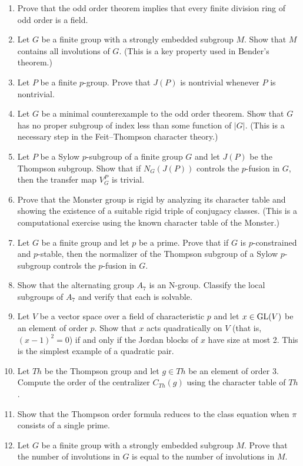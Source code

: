 \begin{enumerate}
\item [I] Prove that the odd order theorem implies that every finite division ring of odd order is a field.
\item [I] Let \(G\) be a finite group with a strongly embedded subgroup \(M\). Show that \(M\) contains all involutions of \(G\). (This is a key property used in Bender's theorem.)
\item [B] Let \(P\) be a finite \(p\)-group. Prove that \(J(P)\) is nontrivial whenever \(P\) is nontrivial.
\item [I] Let \(G\) be a minimal counterexample to the odd order theorem. Show that \(G\) has no proper subgroup of index less than some function of \(|G|\). (This is a necessary step in the Feit--Thompson character theory.)
\item [I] Let \(P\) be a Sylow \(p\)-subgroup of a finite group \(G\) and let \(J(P)\) be the Thompson subgroup. Show that if \(N_G(J(P))\) controls the \(p\)-fusion in \(G\), then the transfer map \(V_G^P\) is trivial.
\item [A] Prove that the Monster group is rigid by analyzing its character table and showing the existence of a suitable rigid triple of conjugacy classes. (This is a computational exercise using the known character table of the Monster.)
\item [I] Let \(G\) be a finite group and let \(p\) be a prime. Prove that if \(G\) is \(p\)-constrained and \(p\)-stable, then the normalizer of the Thompson subgroup of a Sylow \(p\)-subgroup controls the \(p\)-fusion in \(G\).
\item [I] Show that the alternating group \(A_7\) is an N-group. Classify the local subgroups of \(A_7\) and verify that each is solvable.
\item [I] Let \(V\) be a vector space over a field of characteristic \(p\) and let \(x \in \operatorname{GL}(V)\) be an element of order \(p\). Show that \(x\) acts quadratically on \(V\) (that is, \((x-1)^2 = 0\)) if and only if the Jordan blocks of \(x\) have size at most 2. This is the simplest example of a quadratic pair.
\item [I] Let \(Th\) be the Thompson group and let \(g \in Th\) be an element of order 3. Compute the order of the centralizer \(C_{Th}(g)\) using the character table of \(Th\).
\item [B] Show that the Thompson order formula reduces to the class equation when \(\pi\) consists of a single prime.
\item [I] Let \(G\) be a finite group with a strongly embedded subgroup \(M\). Prove that the number of involutions in \(G\) is equal to the number of involutions in \(M\).
\end{enumerate}

